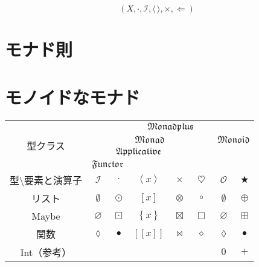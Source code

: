 \documentclass[twocolumn]{jsbook}
\def\[{[\![}
\def\]{]\!]}
\newcommand{\typeclassname}[1]{\mathfrak{#1}}
\newcommand{\typeclassapplicative}{\typeclassname{Applicative}}
\newcommand{\typeclassfunctor}{\typeclassname{Functor}}
\newcommand{\typeclassmonad}{\typeclassname{Monad}}
\newcommand{\typeclassmonadplus}{\typeclassname{Monadplus}}
\newcommand{\typeclassmonoid}{\typeclassname{Monoid}}
\newcommand{\anonymousparameter}{\lozenge}
\newcommand{\constantempty}{\emptyset}
\newcommand{\constantnothing}{\varnothing}
\newcommand{\constantidentityfunction}{\anonymousparameter}
\newcommand{\binaryadd}{+}
\newcommand{\binarycompose}{\bullet}
\newcommand{\binaryfunctormap}{\cdot}
\newcommand{\binaryapplicativemap}{\times}
\newcommand{\binarymonadmap}{\heartsuit}%
\newcommand{\binarylistfunctormap}{\odot}
\newcommand{\binarylistapplicativemap}{\otimes}
\newcommand{\binarylistmonadmap}{\circ}%
\newcommand{\binarylistappend}{\oplus}
\newcommand{\binarymaybefunctormap}{\boxdot}
\newcommand{\binarymaybeapplicativemap}{\boxtimes}
\newcommand{\binarymaybemonadmap}{\Box}%
\newcommand{\binarymaybeappend}{\boxplus}
\newcommand{\binaryfunctionfunctormap}{\binarycompose}
\newcommand{\binaryfunctionapplicativemap}{\Join}%
\newcommand{\binaryfunctionmonadmap}{\diamond}%
\newcommand{\applicativetype}[1]{\left\langle#1\right\rangle}
\newcommand{\listtype}[1]{\left[#1\right]}
\newcommand{\maybetype}[1]{\left\{#1\right\}}
\newcommand{\functyontype}[1]{\[#1\]}
\newcommand{\mathbinaryop}{\bigstar}
\newcommand{\mathidentity}{\mathcal{O}}
\newcommand{\mathidentitymorph}{\mathcal{I}}
\begin{document}
$$(X,\binaryfunctormap,\mathidentitymorph,\langle\,\rangle,\times,\Leftarrow)$$


\section{モナド則}

\section{モノイドなモナド}


\begin{table*}
\begin{center}
\begin{tabular}{||c||c|c|c|c|c|c|c||}
\hline
\multirow{4}{*}{型クラス}
    &\multicolumn{7}{|c||}{$\typeclassmonadplus$}\\
\cline{2-8}
\multirow{3}{*}{}
    &\multicolumn{5}{|c|}{$\typeclassmonad$}
    &\multicolumn{2}{|c||}{$\typeclassmonoid$}\\
\cline{2-5}
\multirow{2}{*}{}
    &\multicolumn{4}{|c|}{$\typeclassapplicative$}
    &
    &\multicolumn{2}{|c||}{ }\\
\cline{2-3}
{ }
    &\multicolumn{2}{|c|}{$\typeclassfunctor$}
    &\multicolumn{2}{|c|}{ }
    &
    &\multicolumn{2}{|c||}{ }\\
\hline\hline
型$\setminus$要素と演算子
    &$\mathidentitymorph$
    &$\binaryfunctormap$
    &$\applicativetype{x}$
    &$\binaryapplicativemap$
    &$\binarymonadmap$
    &$\mathidentity$
    &$\mathbinaryop$\\
\hline
リスト
    &$\constantempty$
    &$\binarylistfunctormap$
    &$\listtype{x}$
    &$\binarylistapplicativemap$
    &$\binarylistmonadmap$
    &$\constantempty$
    &$\binarylistappend$\\
\hline
Maybe
    &$\constantnothing$
    &$\binarymaybefunctormap$
    &$\maybetype{x}$
    &$\binarymaybeapplicativemap$
    &$\binarymaybemonadmap$
    &$\constantnothing$
    &$\binarymaybeappend$\\
\hline
関数
    &$\constantidentityfunction$
    &$\binaryfunctionfunctormap$
    &$\functyontype{x}$
    &$\binaryfunctionapplicativemap$
    &$\binaryfunctionmonadmap$
    &$\constantidentityfunction$
    &$\binarycompose$\\
\hline
Int（参考）
    &
    &
    &
    &
    &
    &$0$
    &$\binaryadd$\\
\hline
\end{tabular}
\end{center}
\end{table*}
\end{document}
